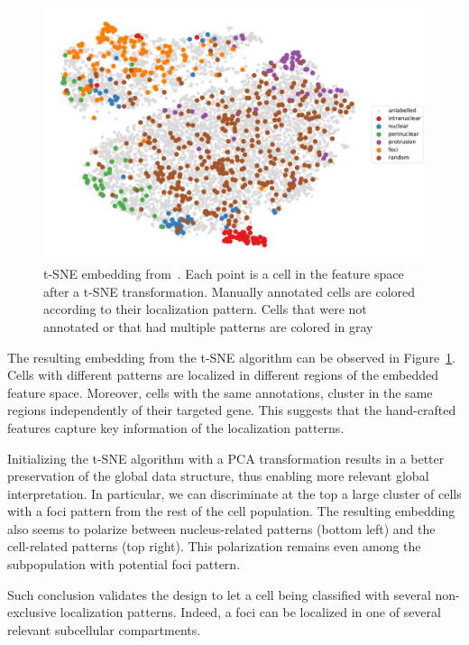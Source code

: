 \begin{figure}[]
    \centering
    \includegraphics[width=\textwidth]{figures/chapter5/tsne_annotation_legend}
    \caption[t-SNE embedding of experimental cells]{t-SNE embedding from~\cite{CHOUAIB_2020}.
	Each point is a cell in the feature space after a t-SNE transformation.
	Manually annotated cells are colored according to their localization pattern.
	Cells that were not annotated or that had multiple patterns are colored in gray}
    \label{fig:tsne_annotation_racha}
\end{figure}

The resulting embedding from the \ac{t-SNE} algorithm can be observed in Figure~\ref{fig:tsne_annotation_racha}.
Cells with different patterns are localized in different regions of the embedded feature space.
Moreover, cells with the same annotations, cluster in the same regions independently of their targeted gene.
This suggests that the hand-crafted features capture key information of the localization patterns.

Initializing the \ac{t-SNE} algorithm with a PCA transformation results in a better preservation of the global data structure, thus enabling more relevant global interpretation.
In particular, we can discriminate at the top a large cluster of cells with a foci pattern from the rest of the cell population.
The resulting embedding also seems to polarize between nucleus-related patterns (bottom left) and the cell-related patterns (top right).
This polarization remains even among the subpopulation with potential foci pattern.

Such conclusion validates the design to let a cell being classified with several non-exclusive localization patterns.
Indeed, a foci can be localized in one of several relevant subcellular compartments.

